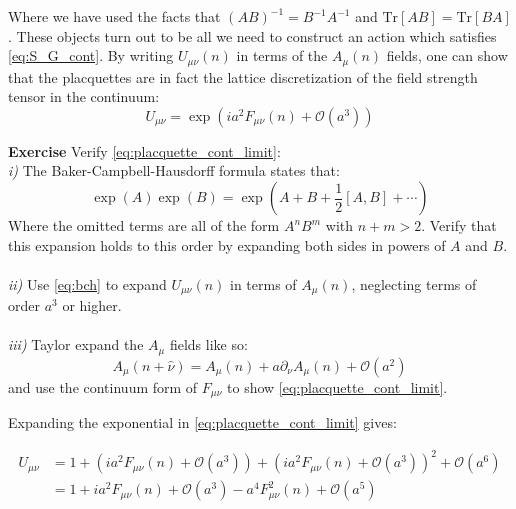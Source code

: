 \documentclass[11pt]{article}
\newcounter{exerciseno}
\DeclareRobustCommand{\exCnt}{\refstepcounter{exerciseno}\theexerciseno}
\begin{document}
Where we have used the facts that $(AB)^{-1}=B^{-1}A^{-1}$ and $\mathrm{Tr}[AB]=\mathrm{Tr}[BA]$. These objects turn out to be all we need to construct an action which satisfies \eqref{eq:S_G_cont}. By writing $U_{\mu\nu}(n)$ in terms of the $A_\mu(n)$ fields, one can show that the placquettes are in fact the lattice discretization of the field strength tensor in the continuum:
\begin{equation}\label{eq:placquette_cont_limit}U_{\mu\nu}=\exp(ia^2F_{\mu\nu}(n)+\mathcal O(a^3))\end{equation}
\begin{tcolorbox}\textbf{Exercise \exCnt}
Verify \eqref{eq:placquette_cont_limit}:\\
\emph{i)} The Baker-Campbell-Hausdorff formula states that:
\begin{equation}\label{eq:bch}\exp(A)\exp(B)=\exp\left(A+B+\frac{1}{2}[A,B]+\cdots\right)\end{equation}
Where the omitted terms are all of the form $A^nB^m$ with $n+m>2$. Verify that this expansion holds to this order by expanding both sides in powers of $A$ and $B$. \\\\
\emph{ii)} Use \eqref{eq:bch} to expand $U_{\mu\nu}(n)$ in terms of $A_{\mu}(n)$, neglecting terms of order $a^3$ or higher.\\\\
\emph{iii)} Taylor expand the $A_\mu$ fields like so: 
\begin{equation}A_\mu(n+\hat\nu)=A_{\mu}(n)+a\partial_\nu A_\mu(n)+\mathcal O(a^2)\end{equation}
and use the continuum form of $F_{\mu\nu}$ to show \eqref{eq:placquette_cont_limit}.
\end{tcolorbox}

Expanding the exponential in \eqref{eq:placquette_cont_limit} gives:

\begin{align*}U_{\mu\nu}&=1+\left(ia^2F_{\mu\nu}(n)+\mathcal O(a^3)\right)+\left(ia^2F_{\mu\nu}(n)+\mathcal O(a^3)\right)^2+\mathcal O(a^6)\\&=1+ia^2F_{\mu\nu}(n)+\mathcal O(a^3)-a^4F_{\mu\nu}^2(n)+\mathcal O(a^5)\end{align*}
\end{document}
